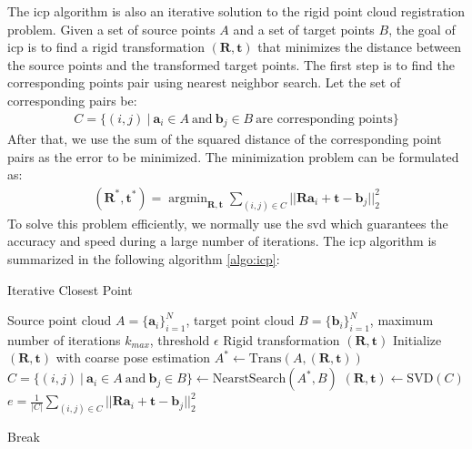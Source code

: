 \documentclass[12pt,DIV14,BCOR12mm,a4paper,footinclude=false,headinclude,parskip=half-,twoside,openright,cleardoublepage=empty,toc=index,bibliography=totoc,listof=totoc]{scrreprt}
\numberwithin{equation}{chapter}
\begin{document}
The \gls{icp} algorithm is also an iterative solution to the rigid point cloud registration problem. Given a set of source points $A$ and a set of target points $B$, the goal of \gls{icp} is to find a rigid transformation $(\mathbf{R},\mathbf{t})$ that minimizes the distance between the source points and the transformed target points. The first step is to find the corresponding points pair using nearest neighbor search. Let the set of corresponding pairs be:
\begin{align}
  C = \{(i,j)\ \vert \ \mathbf{a}_{i}\in A \ \text{and} \ \mathbf{b}_{j}\in B \ \text{are corresponding points}\}
\end{align}
After that, we use the sum of the squared distance of the corresponding point pairs as the error to be minimized. The minimization problem can be formulated as:
\begin{align}
  (\mathbf{R}^{*}, \mathbf{t}^{*})=\mathop{argmin}_{\mathbf{R},\mathbf{t}}\sum_{(i,j)\in C}||\mathbf{Ra}_{i}+\mathbf{t}-\mathbf{b}_{j}||_{2}^{2}
\end{align}
To solve this problem efficiently, we normally use the \gls{svd} which guarantees the accuracy and speed during a large number of iterations. The \gls{icp} algorithm is summarized in the following algorithm \ref{algo:icp}:
\begin{algorithm}[ht]
  \caption{Iterative Closest Point}
  \label{algo:icp}
  \begin{algorithmic}[1]
    \Require
      Source point cloud $A=\{\mathbf{a}_{i}\}_{i=1}^{N}$, target point cloud $B=\{\mathbf{b}_{i}\}_{i=1}^{N}$, maximum number of iterations $k_{max}$, threshold $\epsilon$
    \Ensure
      Rigid transformation $(\mathbf{R},\mathbf{t})$
    \State Initialize $(\mathbf{R},\mathbf{t})$ with coarse pose estimation
      \State $A^{*}\longleftarrow \text{Trans}(A, (\mathbf{R},\mathbf{t}))$
      \State $C=\{(i,j)\ \vert \ \mathbf{a}_{i}\in A \ \text{and} \ \mathbf{b}_{j}\in B \}\longleftarrow \text{NearstSearch}(A^{*}, B)$
      \State $(\mathbf{R}, \mathbf{t})\longleftarrow \text{SVD}(C)$
      \State $e = \frac{1}{\lvert C\rvert}\sum_{(i,j)\in C}||\mathbf{Ra}_{i}+\mathbf{t}-\mathbf{b}_{j}||_{2}^{2}$
      
        \State Break
      \EndIf
    \EndFor
  \end{algorithmic}
\end{algorithm}
\end{document}
